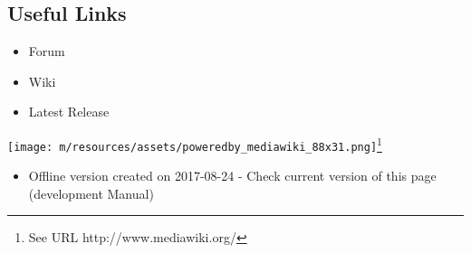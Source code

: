 		
				
		
\subsection{Useful Links}

		
			\begin{itemize}\item  Forum
\item  Wiki
\item  Latest Release
\end{itemize}
		
		
								
		

					
						
																
					
									\texttt{[image: m/resources/assets/poweredby\_mediawiki\_88x31.png]}\footnote{See URL http://www.mediawiki.org/}							
							
\begin{itemize}\item Offline version created on 2017-08-24 - Check current version of this page (development Manual)
\end{itemize}


		
		
